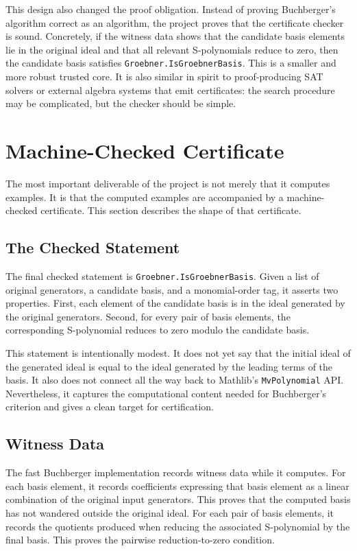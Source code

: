 \documentclass[acmsmall,nonacm,screen]{acmart}
\begin{document}
This design also changed the proof obligation.
Instead of proving Buchberger's algorithm correct as an algorithm, the project proves that the
certificate checker is sound.
Concretely, if the witness data shows that the candidate basis elements lie in the original ideal
and that all relevant S-polynomials reduce to zero, then the candidate basis satisfies
\texttt{Groebner.IsGroebnerBasis}.
This is a smaller and more robust trusted core.
It is also similar in spirit to proof-producing SAT solvers or external algebra systems that emit
certificates: the search procedure may be complicated, but the checker should be simple.

\section{Machine-Checked Certificate}

The most important deliverable of the project is not merely that it computes examples.
It is that the computed examples are accompanied by a machine-checked certificate.
This section describes the shape of that certificate.

\subsection{The Checked Statement}

The final checked statement is \texttt{Groebner.IsGroebnerBasis}.
Given a list of original generators, a candidate basis, and a monomial-order tag, it asserts two
properties.
First, each element of the candidate basis is in the ideal generated by the original generators.
Second, for every pair of basis elements, the corresponding S-polynomial reduces to zero modulo the
candidate basis.

This statement is intentionally modest.
It does not yet say that the initial ideal of the generated ideal is equal to the ideal generated by
the leading terms of the basis.
It also does not connect all the way back to Mathlib's \texttt{MvPolynomial} API.
Nevertheless, it captures the computational content needed for Buchberger's criterion and gives a
clean target for certification.

\subsection{Witness Data}

The fast Buchberger implementation records witness data while it computes.
For each basis element, it records coefficients expressing that basis element as a linear
combination of the original input generators.
This proves that the computed basis has not wandered outside the original ideal.
For each pair of basis elements, it records the quotients produced when reducing the associated
S-polynomial by the final basis.
This proves the pairwise reduction-to-zero condition.
\end{document}
